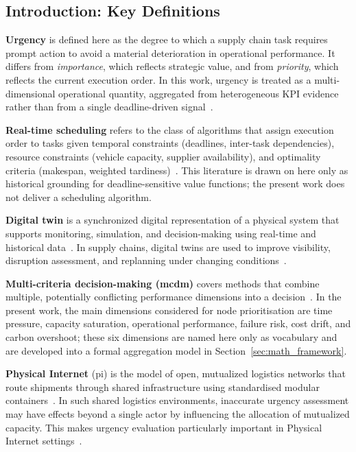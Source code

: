 \subsection{Introduction: Key Definitions}

\textbf{Urgency} is defined here as the degree to which a supply chain task requires prompt action to avoid a material deterioration in operational performance. It differs from \emph{importance}, which reflects strategic value, and from \emph{priority}, which reflects the current execution order. In this work, urgency is treated as a multi-dimensional operational quantity, aggregated from heterogeneous KPI evidence rather than from a single deadline-driven signal~\autocite{cheng2025survey,zhu2018mere}.

\textbf{Real-time scheduling} refers to the class of algorithms that assign execution order to tasks given temporal constraints (deadlines, inter-task dependencies), resource constraints (vehicle capacity, supplier availability), and optimality criteria (makespan, weighted tardiness)~\autocite{pinedo2012scheduling}. This literature is drawn on here only as historical grounding for deadline-sensitive value functions; the present work does not deliver a scheduling algorithm.

\textbf{Digital twin} is a synchronized digital representation of a physical system that supports monitoring, simulation, and decision-making using real-time and historical data~\autocite{ivanov2020digital}. In supply chains, digital twins are used to improve visibility, disruption assessment, and replanning under changing conditions~\autocite{ivanov2020digital,ding2023realtime,hrusovsky2021realtime}.

\textbf{Multi-criteria decision-making (\gls{mcdm})} covers methods that combine multiple, potentially conflicting performance dimensions into a decision~\autocite{saaty1980analytic,brans1986promethee}. In the present work, the main dimensions considered for node prioritisation are time pressure, capacity saturation, operational performance, failure risk, cost drift, and carbon overshoot; these six dimensions are named here only as vocabulary and are developed into a formal aggregation model in Section~\ref{sec:math_framework}.

\textbf{Physical Internet} (\gls{pi}) is the model of open, mutualized logistics networks that route shipments through shared infrastructure using standardised modular containers~\autocite{montreuil2011toward}. In such shared logistics environments, inaccurate urgency assessment may have effects beyond a single actor by influencing the allocation of mutualized capacity. This makes urgency evaluation particularly important in Physical Internet settings~\autocite{montreuil2011toward,leung2022digital}.

